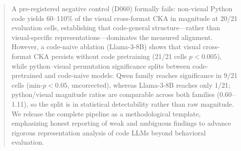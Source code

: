 \begin{abstract}
A pre-registered negative control (D060) formally fails: non-visual Python code yields 60--110\% of the visual cross-format CKA in magnitude at 20/21 evaluation cells, establishing that code-general structure---rather than visual-specific representations---dominates the measured alignment.
However, a code-naive ablation (Llama-3-8B) shows that visual cross-format CKA persists without code pretraining (21/21 cells $p < 0.005$), while python--visual permutation significance splits between code-pretrained and code-naive models: Qwen family reaches significance in 9/21 cells (min-$p<0.05$, uncorrected), whereas Llama-3-8B reaches only 1/21; python/visual magnitude ratios are comparable across both families (0.60--1.11), so the split is in statistical detectability rather than raw magnitude.
We release the complete pipeline as a methodological template, emphasizing honest reporting of weak and ambiguous findings to advance rigorous representation analysis of code LLMs beyond behavioral evaluation.
\end{abstract}
